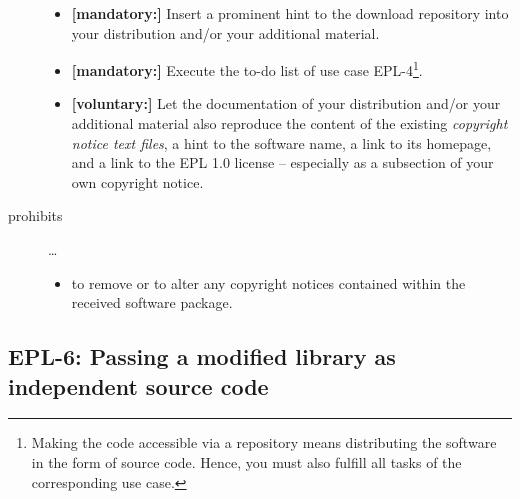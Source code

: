 \begin{description}
\begin{itemize}
  \item \textbf{[mandatory:]} Insert a prominent hint to the download repository
  into your distribution and/or your additional material.

  \item \textbf{[mandatory:]} Execute the to-do list of use case EPL-4\footnote{
  Making the code accessible via a repository means distributing the software in
  the form of source code. Hence, you must also fulfill all tasks of the
  corresponding use case.}.
 
  \item \textbf{[voluntary:]} Let the documentation of your distribution and/or
  your additional material  also reproduce the content of the existing
  \emph{copyright notice text files}, a hint to the software name, a link to its
  homepage, and a link to the EPL 1.0 license -- especially as a subsection of
  your own copyright notice.


\end{itemize}  

\item[prohibits] \ldots
\begin{itemize}
  \item to remove or to alter any copyright notices contained within the
  received software package.
\end{itemize}

\end{description}

\subsection{EPL-6: Passing a modified library as independent source code}
\label{OSUC-08S-EPL}

